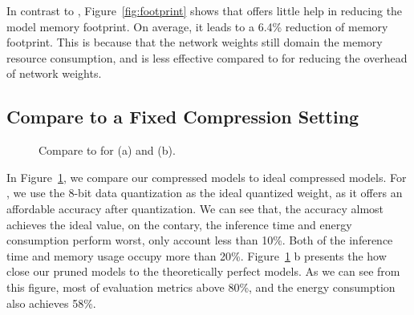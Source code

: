 In contrast to \dquantization, Figure~\ref{fig:footprint} shows that  \pruning offers little help in reducing the model memory footprint.
On average, it leads to a 6.4\% reduction of memory footprint. This is because that the network weights still domain the memory resource
consumption, and \pruning is less effective compared to \dquantization for reducing the overhead of network weights.



\subsection{Compare to a Fixed Compression Setting}

\begin{figure}[!t]
\centering

\hfill
{}
\hfill

\caption{Compare to  for \quantization (a) and \pruning (b).} \label{fig:oracle}
\end{figure}


In Figure~\ref{fig:oracle}, we compare our compressed models to ideal compressed models.
For \quantization, we use the 8-bit data quantization as the ideal
quantized weight, 
as it offers an affordable accuracy after quantization. 
We can see that,  the accuracy almost achieves the ideal value, on the
contary, the inference time and energy consumption perform worst, only account less than 10\%. Both of the inference time and memory usage
occupy more than 20\%. Figure~\ref{fig:oracle} b presents the how close our pruned models to the theoretically perfect models. As we can
see from this figure, most of evaluation metrics above 80\%, and the energy consumption also achieves 58\%.

